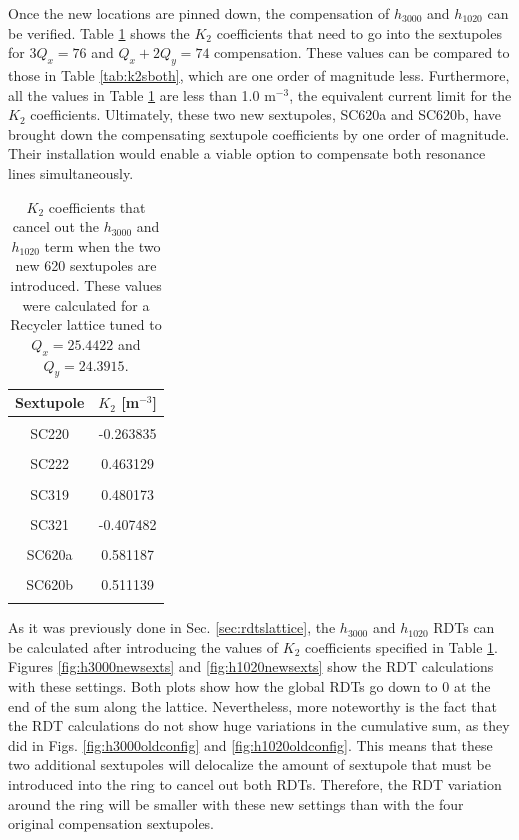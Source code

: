 Once the new locations are pinned down, the compensation of $h_{3000}$ and $h_{1020}$ can be verified. Table \ref{tab:k2s620} shows the $K_2$ coefficients that need to go into the sextupoles for $3Q_x=76$ and $Q_x+ 2Q_y = 74$ compensation. These values can be compared to those in Table \ref{tab:k2sboth}, which are one order of magnitude less. Furthermore, all the values in Table \ref{tab:k2s620} are less than 1.0 m$^{-3}$, the equivalent current limit for the $K_2$ coefficients. Ultimately, these two new sextupoles, SC620a and SC620b, have brought down the compensating sextupole coefficients by one order of magnitude. Their installation would enable a viable option to compensate both resonance lines simultaneously. 

\begin{table}[H]
    \centering
    \caption{$K_2$ coefficients that cancel out the $h_{3000}$ and $h_{1020}$ term when the two new 620 sextupoles are introduced. These values were calculated for a Recycler lattice tuned to $Q_x=25.4422$ and $Q_y=24.3915$.}
    \label{tab:k2s620}
    \begin{tabular}{cc}
    \toprule
    \textbf{Sextupole} & $K_2$ [m$^{-3}$] \\ \midrule
     &  \\
    SC220 & -0.263835 \\
     &  \\
    SC222 & 0.463129 \\
     &  \\
    SC319 & 0.480173 \\
     &  \\
    SC321 & -0.407482 \\
     &  \\
    SC620a & 0.581187 \\
     &  \\ 
    SC620b & 0.511139 \\
     &  \\ \bottomrule
    \end{tabular}
\end{table}

As it was previously done in Sec. \ref{sec:rdtslattice}, the $h_{3000}$ and $h_{1020}$ RDTs can be calculated after introducing the values of $K_2$ coefficients specified in Table \ref{tab:k2s620}. Figures \ref{fig:h3000newsexts} and \ref{fig:h1020newsexts} show the RDT calculations with these settings. Both plots show how the global RDTs go down to 0 at the end of the sum along the lattice. Nevertheless, more noteworthy is the fact that the RDT calculations do not show huge variations in the cumulative sum, as they did in Figs. \ref{fig:h3000oldconfig} and \ref{fig:h1020oldconfig}. This means that these two additional sextupoles will delocalize the amount of sextupole that must be introduced into the ring to cancel out both RDTs. Therefore, the RDT variation around the ring will be smaller with these new settings than with the four original compensation sextupoles.

